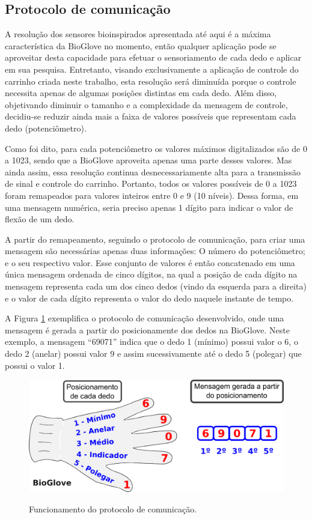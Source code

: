 \documentclass[
	12pt,				%
	openright,			%
	oneside,			%
	a4paper,			%
	english,			%
	brazil				%
	]{abntex2}
\begin{document}
			\subsection{Protocolo de comunicação}


		A resolução dos sensores bioinspirados apresentada até aqui é a máxima característica da BioGlove no momento, então qualquer aplicação pode se aproveitar desta capacidade para efetuar o sensoriamento de cada dedo e aplicar em sua pesquisa. Entretanto, visando exclusivamente a aplicação de controle do carrinho criada neste trabalho, esta resolução será diminuída porque o controle necessita apenas de algumas posições distintas em cada dedo. Além disso, objetivando diminuir o tamanho e a complexidade da mensagem de controle, decidiu-se reduzir ainda mais a faixa de valores possíveis que representam cada dedo (potenciômetro). 
		
		Como foi dito, para cada potenciômetro os valores máximos digitalizados são de 0 a 1023, sendo que a BioGlove aproveita apenas uma parte desses valores. Mas ainda assim, essa resolução continua desnecessariamente alta para a transmissão de sinal e controle do carrinho. Portanto, todos os valores possíveis de 0 a 1023 foram remapeados para valores inteiros entre 0 e 9 (10 níveis). Dessa forma, em uma mensagem numérica, seria preciso apenas 1 dígito para indicar o valor de flexão de um dedo. 
		
		A partir do remapeamento, seguindo o protocolo de comunicação, para criar uma mensagem são necessárias apenas duas informações: O número do potenciômetro; e o seu respectivo valor. Esse conjunto de valores é então concatenado em uma única mensagem ordenada de cinco dígitos, na qual a posição de cada dígito na mensagem representa cada um dos cinco dedos (vindo da esquerda para a direita) e o valor de cada dígito representa o valor do dedo naquele instante de tempo.  
		
		A Figura \ref{Fig:glove-create-msg1} exemplifica o protocolo de comunicação desenvolvido, onde uma mensagem é gerada a partir do posicionamente dos dedos na BioGlove. Neste exemplo, a mensagem ``69071'' indica que o dedo 1 (mínimo) possui valor o 6, o dedo 2 (anelar) possui valor 9 e assim sucessivamente até o dedo 5 (polegar) que possui o valor 1.


		\begin{figure}[h!]
			\centering
			\caption{Funcionamento do protocolo de comunicação.}
  		\includegraphics[width=12cm]{./figures/glove-create-msg1.png}
  		\label{Fig:glove-create-msg1}
		\end{figure}
		
\end{document}
